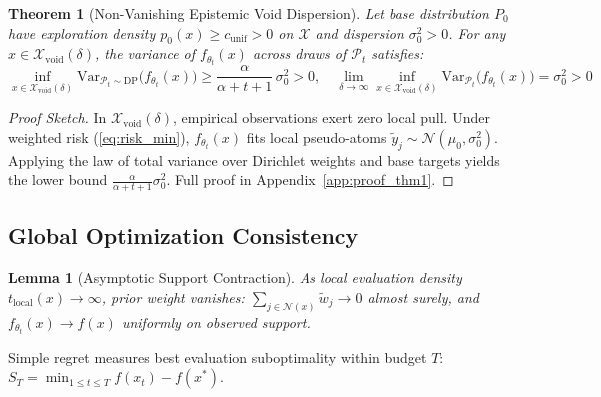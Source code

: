 \documentclass{article}
\newtheorem{theorem}{Theorem}
\newtheorem{lemma}{Lemma}
\begin{document}
\begin{theorem}[Non-Vanishing Epistemic Void Dispersion]
\label{thm:void_dispersion}
Let base distribution $P_0$ have exploration density $p_0(x) \ge c_{\mathrm{unif}} > 0$ on $\mathcal{X}$ and dispersion $\sigma_0^2 > 0$. For any $x \in \mathcal{X}_{\mathrm{void}}(\delta)$, the variance of $f_{\theta_t}(x)$ across draws of $\mathcal{P}_t$ satisfies:
\begin{equation}
\inf_{x \in \mathcal{X}_{\mathrm{void}}(\delta)} \mathrm{Var}_{\mathcal{P}_t \sim \mathrm{DP}}\big(f_{\theta_t}(x)\big) \ge \frac{\alpha}{\alpha + t + 1} \, \sigma_0^2 > 0, \quad \lim_{\delta \to \infty} \inf_{x \in \mathcal{X}_{\mathrm{void}}(\delta)} \mathrm{Var}_{\mathcal{P}_t}\big(f_{\theta_t}(x)\big) = \sigma_0^2 > 0
\end{equation}
\end{theorem}
\begin{proof}[Proof Sketch]
In $\mathcal{X}_{\mathrm{void}}(\delta)$, empirical observations exert zero local pull. Under weighted risk (\ref{eq:risk_min}), $f_{\theta_t}(x)$ fits local pseudo-atoms $\tilde{y}_j \sim \mathcal{N}(\mu_0, \sigma_0^2)$. Applying the law of total variance over Dirichlet weights and base targets yields the lower bound $\frac{\alpha}{\alpha + t + 1}\sigma_0^2$. Full proof in Appendix~\ref{app:proof_thm1}.
\end{proof}

\subsection{Global Optimization Consistency}
\begin{lemma}[Asymptotic Support Contraction]
\label{lem:contraction}
As local evaluation density $t_{\mathrm{local}}(x) \to \infty$, prior weight vanishes: $\sum_{j \in \mathcal{N}(x)} \widetilde{w}_j \to 0$ almost surely, and $f_{\theta_t}(x) \to f(x)$ uniformly on observed support.
\end{lemma}

Simple regret measures best evaluation suboptimality within budget $T$: $S_T = \min_{1 \le t \le T} f(x_t) - f(x^*)$.
\end{document}
